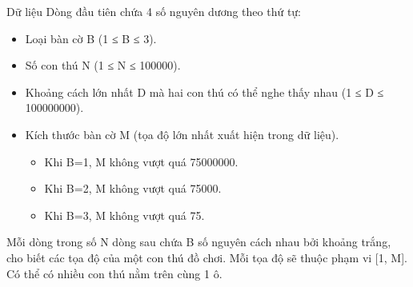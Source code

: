 Dữ liệu
Dòng đầu tiên chứa 4 số nguyên dương theo thứ tự:  
\begin{itemize}
	\item     Loại bàn cờ B (1 ≤ B ≤ 3).   
	\item     Số con thú N (1 ≤ N ≤ 100000).   
	\item     Khoảng cách lớn nhất D mà hai con thú có thể nghe thấy nhau (1 ≤ D ≤ 100000000).   
	\item     Kích thước bàn cờ M (tọa độ lớn nhất xuất hiện trong dữ liệu).    
\begin{itemize}
	\item       Khi B=1, M không vượt quá 75000000.     
	\item       Khi B=2, M không vượt quá 75000.     
	\item       Khi B=3, M không vượt quá 75.     
\end{itemize}
\end{itemize}

   Mỗi dòng trong số N dòng sau chứa B số nguyên cách nhau bởi khoảng trắng, cho biết các tọa độ của một con thú đồ chơi. Mỗi tọa độ sẽ thuộc phạm vi [1, M]. Có thể có nhiều con thú nằm trên cùng 1 ô.